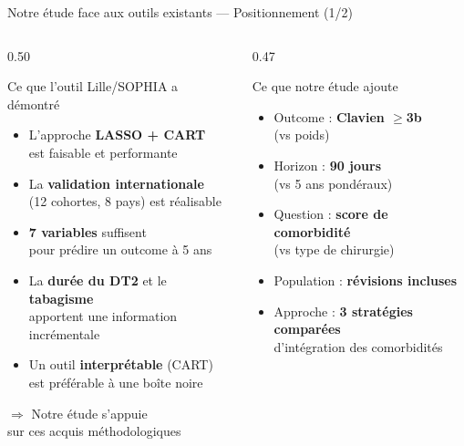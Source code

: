 \documentclass[aspectratio=169]{beamer}
\newcommand{\tightlist}{%
  \setlength{\itemsep}{1pt}\setlength{\parskip}{0pt}%
  \setlength{\parsep}{0pt}\setlength{\topsep}{2pt}}
\begin{document}
\begin{frame}{Notre étude face aux outils existants --- Positionnement (1/2)}
  \begin{columns}[T]
    \begin{column}{0.50\textwidth}
      \begin{exampleblock}{Ce que l'outil Lille/SOPHIA a démontré}
        \footnotesize
        \begin{itemize}\tightlist
          \item L'approche \textbf{LASSO + CART}\\
                est faisable et performante
          \item La \textbf{validation internationale}\\
                (12 cohortes, 8 pays) est réalisable
          \item \textbf{7 variables} suffisent\\
                pour prédire un outcome à 5 ans
          \item La \textbf{durée du DT2} et le \textbf{tabagisme}\\
                apportent une information incrémentale
          \item Un outil \textbf{interprétable} (CART)\\
                est préférable à une boîte noire
        \end{itemize}
        \vspace{4pt}
        $\Rightarrow$ Notre étude s'appuie\\
        sur ces acquis méthodologiques
      \end{exampleblock}
    \end{column}
    \begin{column}{0.47\textwidth}
      \begin{block}{Ce que notre étude ajoute}
        \footnotesize
        \begin{itemize}\tightlist
          \item Outcome : \textbf{Clavien $\geq$3b}\\
                (vs poids)\\[4pt]
          \item Horizon : \textbf{90 jours}\\
                (vs 5 ans pondéraux)\\[4pt]
          \item Question : \textbf{score de comorbidité}\\
                (vs type de chirurgie)\\[4pt]
          \item Population : \textbf{révisions incluses}\\[4pt]
          \item Approche : \textbf{3 stratégies comparées}\\
                d'intégration des comorbidités
        \end{itemize}
      \end{block}
    \end{column}
  \end{columns}
\end{frame}
\end{document}
